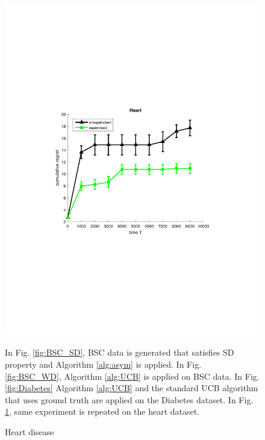 \begin{figure}[!bt]
\begin{minipage}{4cm}
		\includegraphics[scale=0.3]{../Simulations/Figures/Heart_WD1}
		\label{fig:Heart}
		\vspace{-.9cm}
		\caption{\small Heart disease}
	\end{minipage}
	\vspace{.2cm}

\noindent
In Fig. \ref{fig:BSC_SD}, BSC data is generated that satisfies SD property and Algorithm \ref{alg:asym} is applied. In  Fig. \ref{fig:BSC_WD}, Algorithm \ref{alg:UCB} is applied on BSC data. In Fig. \ref{fig:Diabetes} Algorithm \ref{alg:UCB} and the standard UCB algorithm that uses ground truth are applied on the Diabetes dataset. In Fig. \ref{fig:Heart}, same experiment is repeated on the heart dataset. 
\end{figure}
%
